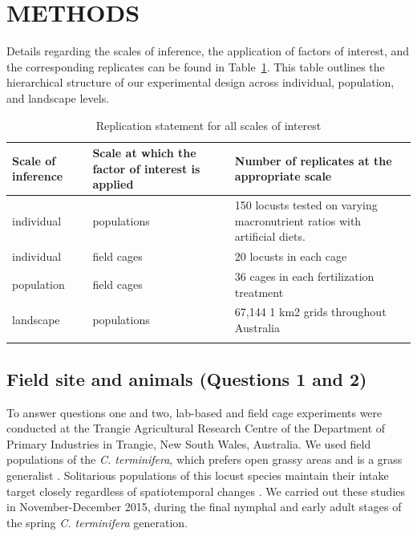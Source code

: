 \documentclass[
]{article}
\begin{document}
\section{METHODS}\label{methods}

Details regarding the scales of inference, the application of factors of
interest, and the corresponding replicates can be found in
Table~\ref{tbl-replication-statement}. This table outlines the
hierarchical structure of our experimental design across individual,
population, and landscape levels.

\begingroup
\setlength{}
\setlength{}\fontsize{8.2pt}{9.9pt}\selectfont

\begin{longtable}{@{\extracolsep{\fill}}lll}

\toprule
Scale of inference & Scale at which the factor of interest is applied & Number of replicates at the appropriate scale \\ 
\midrule\addlinespace[2.5pt]
individual & populations & 150 locusts tested on varying macronutrient ratios with artificial diets. \\ 
individual & field cages & 20 locusts in each cage \\ 
population & field cages & 36 cages in each fertilization treatment \\ 
landscape & populations & 67,144 1 km2 grids throughout Australia \\ 
\bottomrule

\caption{\label{tbl-replication-statement}Replication statement for all
scales of interest}

\tabularnewline

\end{longtable}

\endgroup

\subsection{Field site and animals (Questions 1 and
2)}\label{field-site-and-animals-questions-1-and-2}

To answer questions one and two, lab-based and field cage experiments
were conducted at the Trangie Agricultural Research Centre of the
Department of Primary Industries in Trangie, New South Wales, Australia.
We used field populations of the \emph{C. terminifera}, which prefers
open grassy areas and is a grass generalist \citep{key_general_1945}.
Solitarious populations of this locust species maintain their intake
target closely regardless of spatiotemporal changes
\citep{lawton_mismatched_2021}. We carried out these studies in
November-December 2015, during the final nymphal and early adult stages
of the spring \emph{C. terminifera} generation.
\end{document}
